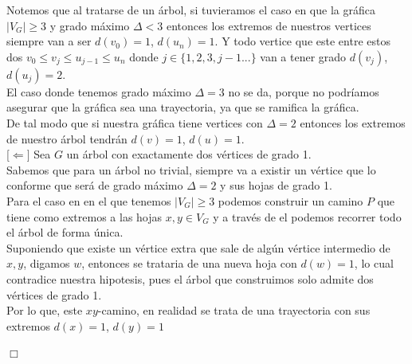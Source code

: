 \documentclass[12pt]{article}
\begin{document}
Notemos que al tratarse de un árbol, si tuvieramos el caso en que la gráfica $|V_G| \geq 3$ y grado máximo $\Delta < 3$ entonces 
los extremos de nuestros vertices siempre van a ser $d(v_0)=1$, $d(u_n)=1$. Y todo vertice que este entre estos dos 
$v_0 \leq v_j \leq u_{j-1} \leq u_n$ donde $j \in \{1, 2, 3, j-1...\}$ van a tener grado $d(v_j)$, $d(u_j) = 2$.\\

El caso donde tenemos grado máximo $\Delta = 3$ no se da, porque no podríamos asegurar que la gráfica sea una 
trayectoria, ya que se ramifica la gráfica.\\

De tal modo que si nuestra gráfica tiene vertices con $\Delta = 2$ entonces los extremos de nuestro árbol tendrán $d(v)=1$, $d(u)=1$.\\

{\color{blue} [$\Leftarrow]$} Sea $G$ un árbol con exactamente dos vértices de grado 1.\\

Sabemos que para un árbol no trivial, siempre va a existir un vértice que lo conforme que será de grado máximo 
$\Delta = 2$ y sus hojas de grado 1.\\

Para el caso en en el que tenemos $|V_G| \geq 3$ podemos construir un camino $P$ que tiene como extremos a las hojas 
$x, y \in V_G$ y a través de el podemos recorrer todo el árbol de forma única.\\

Suponiendo que existe un vértice extra que sale de algún vértice intermedio de $x, y$, digamos $w$, entonces se trataria de una nueva hoja con $d(w) = 1$, lo cual contradice 
nuestra hipotesis, pues el árbol que construimos solo admite dos vértices de grado 1.\\

Por lo que, este $xy$-camino, en realidad se trata de una trayectoria con sus extremos $d(x)=1$, $d(y)=1$

\hfill $\Box$

\vspace{1cm}
\end{document}
